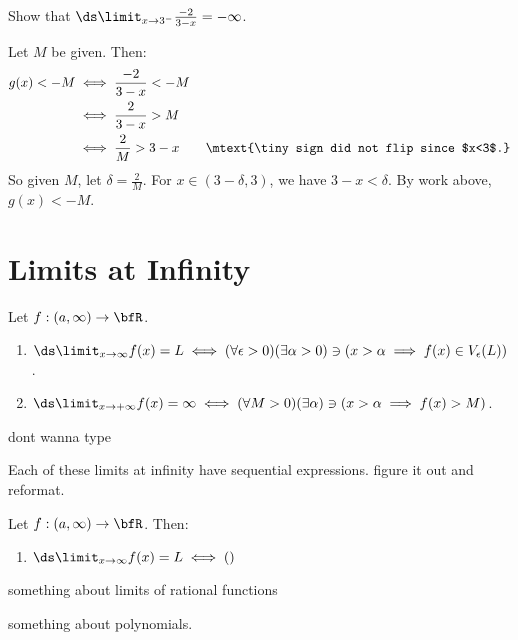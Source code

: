     \begin{example}
        Show that $\ds \limit_{x \rightarrow 3^{-}}\frac{-2}{3-x} = -\infty$.
    \end{example}
        \begin{solution}
            Let $M$ be given. Then:
                \begin{equation*}
                \begin{split}
                    g(x) < -M 
                    &\iff \frac{-2}{3-x} < -M \\
                    &\iff \frac{2}{3-x} > M \\
                    &\iff \frac{2}{M} > 3-x \quad\quad{\mtext{\tiny sign did not flip since $x<3$.}}
                \end{split}
                \end{equation*}
            So given $M$, let $\delta  = \frac{2}{M}$. For $x \in (3 - \delta,3)$, we have $3-x < \delta$. By work above, $g(x) < -M$.
        \end{solution}

\section{Limits at Infinity}

    \begin{definition}
        Let $f:(a,\infty) \rightarrow \bfR$.
        \begin{enumerate}[label = (\arabic*)]
            \item $\ds \limit_{x \rightarrow \infty}f(x) = L \iff (\forall \epsilon > 0)(\exists \alpha > 0) \ni (x > \alpha \implies f(x) \in V_\epsilon(L))$.
            \item $\ds \limit_{x \rightarrow +\infty}f(x) = \infty \iff (\forall M>0)(\exists \alpha) \ni (x > \alpha \implies f(x) > M)$.
        \end{enumerate}
    \end{definition}

    \begin{example}
        {\color{red}dont wanna type}
    \end{example}

    \begin{remark}
        Each of these limits at infinity have sequential expressions. {\color{red} figure it out and reformat.}
    \end{remark}

    \begin{proposition}
        Let $f:(a,\infty) \rightarrow \bfR$. Then:
            \begin{enumerate}[label = (\arabic*)]
                \item $\ds \limit_{x \rightarrow \infty}f(x) = L \iff ()$
            \end{enumerate}
    \end{proposition}

    \begin{proposition}
        {\color{red} something about limits of rational functions}
    \end{proposition}

    \begin{corollary}
        {\color{red} something about polynomials.}
    \end{corollary}
